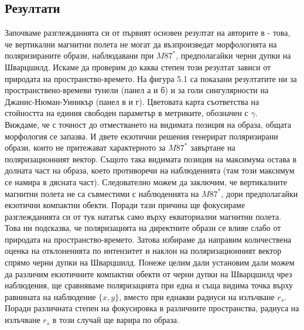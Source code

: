 \documentclass[12pt]{article}
\numberwithin{equation}{section}
\numberwithin{figure}{section}
\begin{document}
	\subsection{Резултати}
	
	Започваме разглежданията си от първият основен резултат на авторите в \cite{Narayan2021} - това, че вертикални магнитни полета не могат да възпроизведат морфологията на поляризираните образи, наблюдавани при $M87^*$, предполагайки черни дупки на Шварцшилд. Искаме да проверим до каква степен този резултат зависи от природата на пространство-времето. На фигура 5.1 са показани резултатите ни за пространствено-времеви тунели (панел а и б) и за голи сингулярности на Джанис-Нюман-Уиникър (панел в и г). Цветовата карта съответства на стойността на единия свободен параметър в метриките, обозначен с $\gamma$. \\
	
	Виждаме, че с точност до отместването на видимата позиция на образа, общата морфология се запазва. И двете екзотични решения генерират поляризирани образи, които не притежават характерното за $M87^*$ завъртане на поляризационният вектор. Същото така видимата позиция на максимума остава в долната част на образа, което противоречи на наблюденията (там този максимум се намира в дясната част). Следователно можем да заключим, че вертикалните магнитни полета не са съвместими с наблюденията на $M87^*$, дори предполагайки екзотични компактни обекти. Поради тази причина ще фокусираме разглежданията си от тук нататък само върху екваториални магнитни полета. \\
	
	Това ни подсказва, че поляризацията на директните образи се влияе слабо от природата на пространство-времето. Затова избираме да направим количествена оценка на отклоненията по интензитет и наклон на поляризационният вектор спрямо черни дупки на Шварцшилд. Понеже целим дали установим дали можем да различим екзотичните компактни обекти от черни дупки на Шварцшилд чрез наблюдения, ще сравняваме поляризацията при една и съща видима точка върху равнината на наблюдение $\{x,y\}$, вместо при еднакви радиуси на излъчване $r_s$. Поради различната степен на фокусировка в различните пространства, радиуса на излъчване $r_s$ в този случай ще варира по образа.\\
\end{document}
